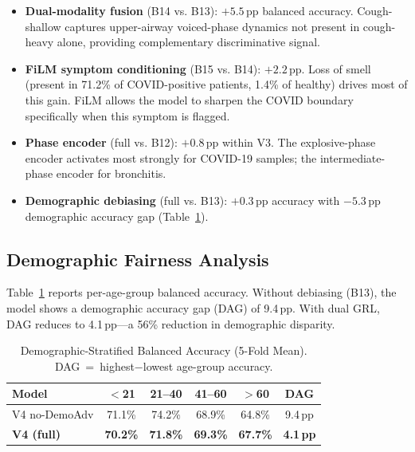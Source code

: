 \documentclass[journal]{IEEEtran}
\begin{document}
\begin{itemize}
\item \textbf{Dual-modality fusion} (B14 vs. B13): $+5.5$\,pp
balanced accuracy. Cough-shallow captures upper-airway voiced-phase
dynamics not present in cough-heavy alone, providing complementary
discriminative signal.

\item \textbf{FiLM symptom conditioning} (B15 vs. B14): $+2.2$\,pp.
Loss of smell (present in 71.2\% of COVID-positive patients, 1.4\%
of healthy) drives most of this gain. FiLM allows the model to
sharpen the COVID boundary specifically when this symptom is flagged.

\item \textbf{Phase encoder} (full vs. B12): $+0.8$\,pp within V3.
The explosive-phase encoder activates most strongly for COVID-19
samples; the intermediate-phase encoder for bronchitis.

\item \textbf{Demographic debiasing} (full vs. B13): $+0.3$\,pp
accuracy with $-5.3$\,pp demographic accuracy gap (Table~\ref{tab:demo}).
\end{itemize}

\subsection{Demographic Fairness Analysis}

Table~\ref{tab:demo} reports per-age-group balanced accuracy.
Without debiasing (B13), the model shows a demographic accuracy gap
(DAG) of 9.4\,pp. With dual GRL, DAG reduces to 4.1\,pp---a 56\%
reduction in demographic disparity.

\begin{table}[!t]
\renewcommand{\arraystretch}{1.2}
\caption{Demographic-Stratified Balanced Accuracy (5-Fold Mean).
         DAG~=~highest$-$lowest age-group accuracy.}
\label{tab:demo}
\centering
\begin{tabular}{lcccc|c}
\toprule
\textbf{Model} & \textbf{$<$21} & \textbf{21--40}
               & \textbf{41--60} & \textbf{$>$60} & \textbf{DAG} \\
\midrule
V4 no-DemoAdv & 71.1\% & 74.2\% & 68.9\% & 64.8\% & 9.4\,pp \\
\textbf{V4 (full)} & \textbf{70.2\%} & \textbf{71.8\%} & \textbf{69.3\%}
                   & \textbf{67.7\%} & \textbf{4.1\,pp} \\
\bottomrule
\end{tabular}
\end{table}
\end{document}
